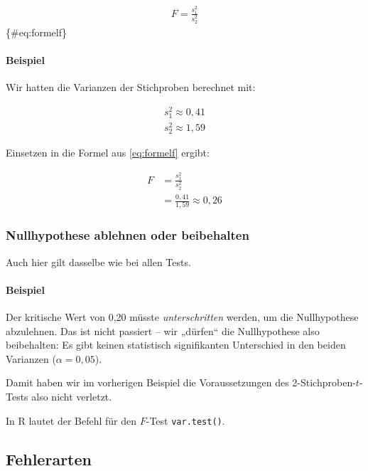 \documentclass[
  ngerman,
]{article}
\begin{document}
\[\begin{aligned}
F=\frac{s^2_1}{s^2_2}
\end{aligned}\]\{\#eq:formelf\}

\hypertarget{beispiel-21}{%
\paragraph{Beispiel}\label{beispiel-21}}

Wir hatten die Varianzen der Stichproben berechnet mit:

\[\begin{aligned}
s^2_1\approx0{,}41\\
s^2_2\approx1{,}59
\end{aligned}\]

Einsetzen in die Formel aus \autoref{eq:formelf} ergibt:

\[\begin{aligned}
F&=\frac{s^2_1}{s^2_2}\\[6pt]
&=\frac{0{,}41}{1{,}59}\approx0{,}26
\end{aligned}\]

\hypertarget{nullhypothese-ablehnen-oder-beibehalten}{%
\subsubsection{Nullhypothese ablehnen oder beibehalten}\label{nullhypothese-ablehnen-oder-beibehalten}}

Auch hier gilt dasselbe wie bei allen Tests.

\hypertarget{beispiel-22}{%
\paragraph{Beispiel}\label{beispiel-22}}

Der kritische Wert von 0,20 müsste \emph{unterschritten} werden, um die Nullhypothese abzulehnen. Das ist nicht passiert -- wir „dürfen`` die Nullhypothese also beibehalten: Es gibt keinen statistisch signifikanten Unterschied in den beiden Varianzen (\(\alpha=0{,}05\)).

Damit haben wir im vorherigen Beispiel die Voraussetzungen des 2-Stichproben-\(t\)-Tests also nicht verletzt.

\begin{rtip}
In R lautet der Befehl für den $F$-Test {\tt var.test()}.
\end{rtip}

\hypertarget{fehlerarten}{%
\subsection{Fehlerarten}\label{fehlerarten}}
\end{document}
